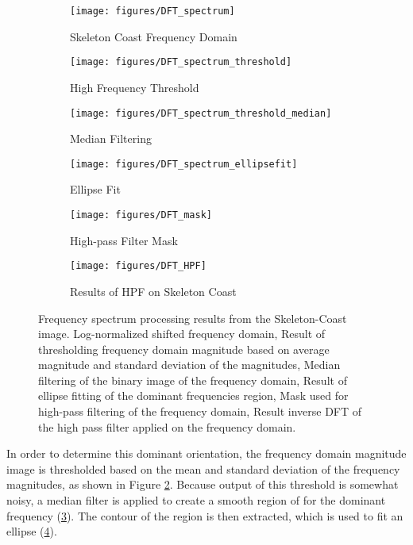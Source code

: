 \begin{figure}
	\centering
	\begin{subfigure}{0.48\textwidth}
		\centering
		\texttt{[image: figures/DFT\_spectrum]}
		\caption{Skeleton Coast Frequency Domain}
		\label{fig:dft_spectrum}
	\end{subfigure}
	\begin{subfigure}{0.48\textwidth}
		\centering
		\texttt{[image: figures/DFT\_spectrum\_threshold]}
		\caption{High Frequency Threshold}
		\label{fig:DFT_spectrum_threshold}
	\end{subfigure}
	\begin{subfigure}{0.48\textwidth}
		\centering
		\texttt{[image: figures/DFT\_spectrum\_threshold\_median]}
		\caption{Median Filtering}
		\label{fig:DFT_spectrum_threshold_median}
	\end{subfigure}
	\begin{subfigure}{0.48\textwidth}
		\centering
		\texttt{[image: figures/DFT\_spectrum\_ellipsefit]}
		\caption{Ellipse Fit}
		\label{fig:DFT_spectrum_ellipsefit}
	\end{subfigure}
	\begin{subfigure}{0.48\textwidth}
		\centering
		\texttt{[image: figures/DFT\_mask]}
		\caption{High-pass Filter Mask}
		\label{fig:DFT_mask}
	\end{subfigure} 
	\begin{subfigure}{0.48\textwidth}
		\centering
		\texttt{[image: figures/DFT\_HPF]}
		\caption{Results of HPF on Skeleton Coast} 
		\label{fig:DFT_HPF}
	\end{subfigure} 
	\caption{Frequency spectrum processing results from the Skeleton-Coast image.  Log-normalized shifted frequency domain,  Result of thresholding frequency domain magnitude based on average magnitude and standard deviation of the magnitudes,  Median filtering of the binary image of the frequency domain,  Result of ellipse fitting of the dominant frequencies region,  Mask used for high-pass filtering of the frequency domain,  Result inverse DFT of the high pass filter applied on the frequency domain. }
	\label{fig:DFT_processing}
\end{figure}

In order to determine this dominant orientation, the frequency domain magnitude image is thresholded based on the mean and standard deviation of the frequency magnitudes, as shown in Figure \ref{fig:DFT_spectrum_threshold}. Because output of this threshold is somewhat noisy, a median filter is applied to create a smooth region of for the dominant frequency (\ref{fig:DFT_spectrum_threshold_median}). The contour of the region is then extracted, which is used to fit an ellipse (\ref{fig:DFT_spectrum_ellipsefit}).

